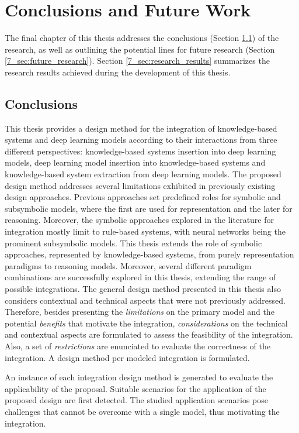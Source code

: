\chapter{Conclusions and Future Work}
\label{chap:conc}
The final chapter of this thesis addresses the conclusions (Section \ref{7_sec:conclusions}) of the research, as well as outlining the potential lines for future research (Section \ref{7_sec:future_research}). Section \ref{7_sec:research_results} summarizes the research results achieved during the development of this thesis.

\section{Conclusions}\label{7_sec:conclusions}
This thesis provides a design method for the integration of knowledge-based systems and deep learning models according to their interactions from three different perspectives: knowledge-based systems insertion into deep learning models, deep learning model insertion into knowledge-based systems and knowledge-based system extraction from deep learning models. The proposed design method addresses several limitations exhibited in previously existing design approaches. Previous approaches set predefined roles for symbolic and subsymbolic models, where the first are used for representation and the later for reasoning. Moreover, the symbolic approaches explored in the literature for integration mostly limit to rule-based systems, with neural networks being the prominent subsymbolic models. This thesis extends the role of symbolic approaches, represented by knowledge-based systems, from purely representation paradigms to reasoning models. Moreover, several different paradigm combinations are successfully explored in this thesis, extending the range of possible integrations. The general design method presented in this thesis also considers contextual and technical aspects that were not previously addressed. Therefore, besides presenting the \textit{limitations} on the primary model and the potential \textit{benefits} that motivate the integration, \textit{considerations} on the technical and contextual aspects are formulated to assess the feasibility of the integration. Also, a set of \textit{restrictions} are enunciated to evaluate the correctness of the integration. A design method per modeled integration is formulated.

An instance of each integration design method is generated to evaluate the applicability of the proposal. Suitable scenarios for the application of the proposed design are first detected. The studied application scenarios pose challenges that cannot be overcome with a single model, thus motivating the integration. 

